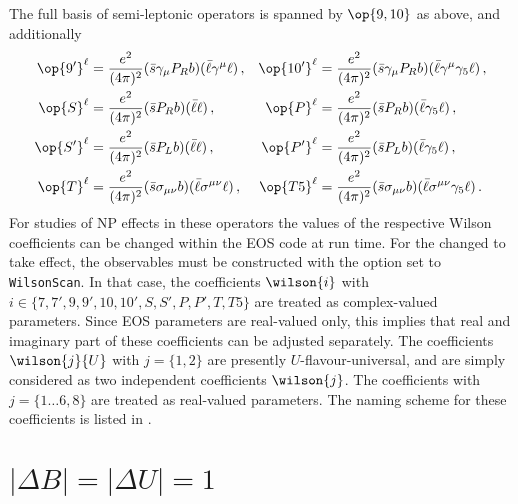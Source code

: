 The full basis of semi-leptonic operators is spanned by $\op{9,10}$ as above, and additionally
\begin{align}
  \op{9'}^{\ell}  & = \frac{e^2}{(4\pi)^2} (\bar{s} \gamma_\mu P_R b) 
                      (\bar{\ell} \gamma^\mu \ell) \,, &
  \op{10'}^{\ell} & = \frac{e^2}{(4\pi)^2} (\bar{s} \gamma_\mu P_R b)
                      (\bar{\ell} \gamma^\mu \gamma_5 \ell) \,,\\
  \op{S}^{\ell}   & = \frac{e^2}{(4\pi)^2} (\bar{s} P_R b)
                      (\bar{\ell} \ell) \,, &
  \op{P}^{\ell}   & = \frac{e^2}{(4\pi)^2} (\bar{s} P_R b)
                      (\bar{\ell} \gamma_5 \ell) \,,\\
  \op{S'}^{\ell}  & = \frac{e^2}{(4\pi)^2} (\bar{s} P_L b)
                      (\bar{\ell} \ell) \,, &
  \op{P'}^{\ell}  & = \frac{e^2}{(4\pi)^2} (\bar{s} P_L b)
                      (\bar{\ell} \gamma_5 \ell) \,,\\
  \op{T}^{\ell}   & = \frac{e^2}{(4\pi)^2} (\bar{s} \sigma_{\mu\nu} b)
                      (\bar{\ell} \sigma^{\mu\nu} \ell) \,, &
  \op{T5}^{\ell}  & = \frac{e^2}{(4\pi)^2} (\bar{s} \sigma_{\mu\nu} b)
                      (\bar{\ell} \sigma^{\mu\nu} \gamma_5 \ell) \,.
\end{align}
For studies of NP effects in these operators the values of the respective Wilson coefficients
can be changed within the EOS code at run time. For the changed to take effect, the observables
must be constructed with the option  set to \texttt{WilsonScan}. In that case, the
coefficients $\wilson{i}$ with $i\in \lbrace 7,7',9,9',10,10',S,S',P,P',T,T5\rbrace$ are treated
as complex-valued parameters.
Since EOS parameters are real-valued only, this implies that real and
imaginary part of these coefficients can be adjusted separately.
The coefficients $\wilson{j}{U}$ with $j=\lbrace 1,2\rbrace$ are presently
$U$-flavour-universal, and are simply considered as two independent coefficients $\wilson{j}$.
The coefficients with $j=\lbrace 1\dots 6, 8\rbrace$ are treated as real-valued parameters.
The naming scheme for these coefficients is listed in .


%
%

\section{$|\Delta B| = |\Delta U| = 1$}

